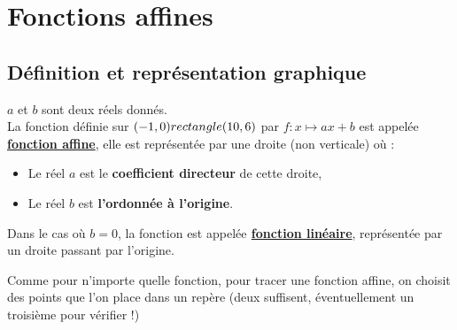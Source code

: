 



\chapter{Fonctions affines}

\section{Définition et représentation graphique}

\begin{Définition}
$a$ et $b$ sont deux réels donnés.\\
La fonction définie sur $(-1,0) rectangle (10,6)$ par $f : x\mapsto ax+b$ est appelée {\bf{\underline{fonction affine}}}, elle est représentée par une droite (non verticale) où :
\begin{itemize}[label=\textcolor{Couleur6}{$\bullet$}]
\item Le réel $a$ est le {\bf{coefficient directeur}} de cette droite,
\item Le réel $b$ est {\bf{l'ordonnée à l'origine}}.
\end{itemize}
Dans le cas où $b=0$, la fonction est appelée{\bf{ \underline{fonction linéaire}}}, représentée par un droite passant par l'origine.
\end{Définition}

\noindent Comme pour n'importe quelle fonction, pour tracer une fonction affine, on choisit des points que l'on place dans un repère (deux suffisent, éventuellement un troisième pour vérifier !)

